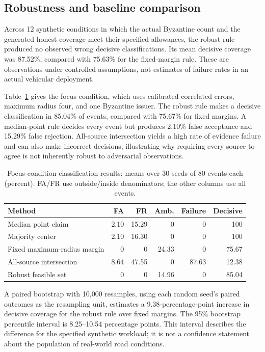 \subsection{Robustness and baseline comparison}
Across 12 synthetic conditions in which the actual Byzantine count and the generated honest coverage meet their specified allowances, the robust rule produced no observed wrong decisive classifications. Its mean decisive coverage was 87.52\%, compared with 75.63\% for the fixed-margin rule. These are observations under controlled assumptions, not estimates of failure rates in an actual vehicular deployment.

Table~\ref{tab:semantic} gives the focus condition, which uses calibrated correlated errors, maximum radius four, and one Byzantine issuer. The robust rule makes a decisive classification in 85.04\% of events, compared with 75.67\% for fixed margins. A median-point rule decides every event but produces 2.10\% false acceptance and 15.29\% false rejection. All-source intersection yields a high rate of evidence failure and can also make incorrect decisions, illustrating why requiring every source to agree is not inherently robust to adversarial observations.

\begin{table}[htbp]\centering\small
\caption{Focus-condition classification results: means over 30 seeds of 80 events each (percent). FA/FR use outside/inside denominators; the other columns use all events.}\label{tab:semantic}
\begin{tabular}{lrrrrr}\toprule
Method&FA&FR&Amb.&Failure&Decisive\\\midrule
Median point claim&2.10&15.29&0&0&100\\
Majority center&2.10&16.30&0&0&100\\
Fixed maximum-radius margin&0&0&24.33&0&75.67\\
All-source intersection&8.64&47.55&0&87.63&12.38\\
Robust feasible set&0&0&14.96&0&85.04\\\bottomrule
\end{tabular}\end{table}

A paired bootstrap with 10,000 resamples, using each random seed's paired outcomes as the resampling unit, estimates a 9.38-percentage-point increase in decisive coverage for the robust rule over fixed margins. The 95\% bootstrap percentile interval is 8.25--10.54 percentage points. This interval describes the difference for the specified synthetic workload; it is not a confidence statement about the population of real-world road conditions.

